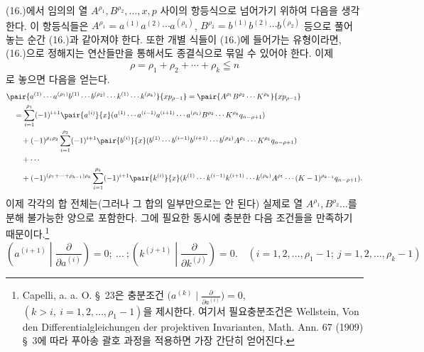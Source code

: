 
(16.)에서 임의의 열 $A^{\rho_1},B^{\rho_2},\ldots,x,p$ 사이의 항등식으로 넘어가기 위하여 다음을 생각한다. 이 항등식들은 $A^{\rho_1}=a^{(1)}a^{(2)}\cdots a^{(\rho_1)}$, $B^{\rho_2}=b^{(1)}b^{(2)}\cdots b^{(\rho_2)}$ 등으로 풀어 놓는 순간 (16.)과 같아져야 한다. 또한 개별 식들이 (16.)에 들어가는 유형이라면, (16.)으로 정해지는 연산들만을 통해서도 종결식으로 묶일 수 있어야 한다. 이제
\begin{equation}
 \rho=\rho_1+\rho_2+\cdots+\rho_k\leqq n
\tag{18}
\end{equation}
로 놓으면 다음을 얻는다.
\begin{align*}
&\pair{a^{(1)}\cdots a^{(\rho_1)}b^{(1)}\cdots b^{(\rho_2)}\cdots k^{(1)}\cdots k^{(\rho_k)}}{xp_{\rho-1}}
  =\pair{A^{\rho_1}B^{\rho_2}\cdots K^{\rho_k}}{xp_{\rho-1}} \\
&\quad=\sum_{i=1}^{\rho_1}(-1)^{i+1}\pair{a^{(i)}}{x}(a^{(1)}\cdots a^{(i-1)}a^{(i+1)}\cdots a^{(\rho_1)}B^{\rho_2}\cdots K^{\rho_k}q_{n-\rho+1})\\
&\qquad+(-1)^{\rho_1\rho_2}\sum_{i=1}^{\rho_2}(-1)^{i+1}\pair{b^{(i)}}{x}(b^{(1)}\cdots b^{(i-1)}b^{(i+1)}\cdots b^{(\rho_2)}A^{\rho_1}\cdots K^{\rho_k}q_{n-\rho+1})\\
&\qquad+\cdots\\
&\qquad+(-1)^{(\rho_1+\cdots+\rho_{k-1})\rho_k}\sum_{i=1}^{\rho_k}(-1)^{i+1}\pair{k^{(i)}}{x}(k^{(1)}\cdots k^{(i-1)}k^{(i+1)}\cdots k^{(\rho_k)}A^{\rho_1}\cdots (K-1)^{\rho_{k-1}}q_{n-\rho+1}).
\end{align*}
이제 각각의 합 전체는(그러나 그 합의 일부만으로는 안 된다) 실제로 열 $A^{\rho_1},B^{\rho_2}\ldots$를 분해 불가능한 양으로 포함한다. 그에 필요한 동시에 충분한 다음 조건들을 만족하기 때문이다.\footnote{Capelli, a. a. O. \S\ 23은 충분조건 $\bigl(a^{(k)}\mid \frac{\partial}{\partial a^{(i)}}\bigr)=0$, $(k>i,\ i=1,2,\ldots,\rho_1-1)$을 제시한다. 여기서 필요충분조건은 Wellstein, Von den Differentialgleichungen der projektiven Invarianten, Math. Ann. 67 (1909) \S\ 3에 따라 푸아송 괄호 과정을 적용하면 가장 간단히 얻어진다.}
\begin{equation}
 \left(a^{(i+1)}\middle|\frac{\partial}{\partial a^{(i)}}\right)=0;\ \ldots\ ;
 \left(k^{(j+1)}\middle|\frac{\partial}{\partial k^{(j)}}\right)=0.
 \quad (i=1,2,\ldots,\rho_1-1;\ j=1,2,\ldots,\rho_k-1)
\tag{19}
\end{equation}
